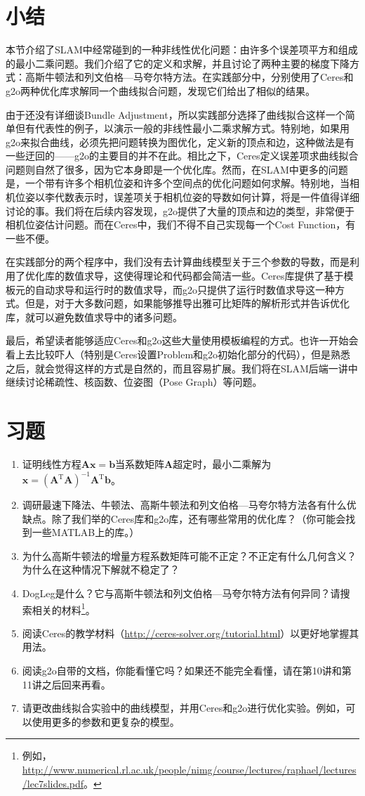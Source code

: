 \clearpage
\section{小结}
本节介绍了SLAM中经常碰到的一种非线性优化问题：由许多个误差项平方和组成的最小二乘问题。我们介绍了它的定义和求解，并且讨论了两种主要的梯度下降方式：高斯牛顿法和列文伯格—马夸尔特方法。在实践部分中，分别使用了Ceres和g2o两种优化库求解同一个曲线拟合问题，发现它们给出了相似的结果。

由于还没有详细谈Bundle Adjustment，所以实践部分选择了曲线拟合这样一个简单但有代表性的例子，以演示一般的非线性最小二乘求解方式。特别地，如果用g2o来拟合曲线，必须先把问题转换为图优化，定义新的顶点和边，这种做法是有一些迂回的——g2o的主要目的并不在此。相比之下，Ceres定义误差项求曲线拟合问题则自然了很多，因为它本身即是一个优化库。然而，在SLAM中更多的问题是，一个带有许多个相机位姿和许多个空间点的优化问题如何求解。特别地，当相机位姿以李代数表示时，误差项关于相机位姿的导数如何计算，将是一件值得详细讨论的事。我们将在后续内容发现，g2o提供了大量的顶点和边的类型，非常便于相机位姿估计问题。而在Ceres中，我们不得不自己实现每一个Cost Function，有一些不便。

在实践部分的两个程序中，我们没有去计算曲线模型关于三个参数的导数，而是利用了优化库的数值求导，这使得理论和代码都会简洁一些。Ceres库提供了基于模板元的自动求导和运行时的数值求导，而g2o只提供了运行时数值求导这一种方式。但是，对于大多数问题，如果能够推导出雅可比矩阵的解析形式并告诉优化库，就可以避免数值求导中的诸多问题。

最后，希望读者能够适应Ceres和g2o这些大量使用模板编程的方式。也许一开始会看上去比较吓人（特别是Ceres设置Problem和g2o初始化部分的代码），但是熟悉之后，就会觉得这样的方式是自然的，而且容易扩展。我们将在SLAM后端一讲中继续讨论稀疏性、核函数、位姿图（Pose Graph）等问题。

\section*{习题}
\begin{enumerate}
	\item 证明线性方程$\bm{A} \bm{x} = \bm{b}$当系数矩阵$\bm{A}$超定时，最小二乘解为$\bm{x} = (\bm{A}^\mathrm{T}\bm{A})^{-1}\bm{A}^\mathrm{T} \bm{b}$。
	\item 调研最速下降法、牛顿法、高斯牛顿法和列文伯格—马夸尔特方法各有什么优缺点。除了我们举的Ceres库和g2o库，还有哪些常用的优化库？（你可能会找到一些MATLAB上的库。）
	\item 为什么高斯牛顿法的增量方程系数矩阵可能不正定？不正定有什么几何含义？为什么在这种情况下解就不稳定了？
\clearpage
	\item DogLeg是什么？它与高斯牛顿法和列文伯格—马夸尔特方法有何异同？请搜索相关的材料\footnote{\mbox{例如，}\url{http://www.numerical.rl.ac.uk/people/nimg/course/lectures/raphael/lectures/lec7slides.pdf}。}。
	\item 阅读Ceres的教学材料（\url{http://ceres-solver.org/tutorial.html}）以更好地掌握其用法。
	\item 阅读g2o自带的文档，你能看懂它吗？如果还不能完全看懂，请在第10讲和第11讲之后回来再看。
	\item[\optional] 请更改曲线拟合实验中的曲线模型，并用Ceres和g2o进行优化实验。例如，可以使用更多的参数和更复杂的模型。
\end{enumerate}
